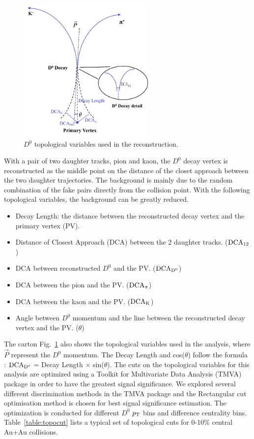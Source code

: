 \documentclass[%
 reprint,	
 amsmath,amssymb,
 aps,
 prc,
]{revtex4-1}
\begin{document}
\begin{figure}
\centering
\includegraphics[width=0.6\textwidth]{fig/D0carton.pdf}
\caption{$D^{0}$ topological variables used in the reconstruction.}
\label{fig:D0carton} 
\end{figure}

With a pair of two daughter tracks, pion and kaon, the $D^0$ decay vertex is reconstructed as the middle point on the distance of the closet approach between the two daughter trajectories. The background is mainly due to the random combination of the fake pairs directly from the collision point. With the following topological variables, the background can be greatly reduced.

 \begin{itemize} 
  \item Decay Length: the distance between the reconstructed decay vertex and the primary vertex (PV).
  \item Distance of Closest Approach (DCA) between the 2 daughter tracks. ($\rm DCA_{12}$)
  \item DCA between reconstructed $D^0$ and the PV. ($\rm DCA_{D^{0}}$)
  \item DCA between the pion and the PV. ($\rm DCA_{\pi}$)
  \item DCA between the kaon and the PV. ($\rm DCA_{K}$)
  \item Angle between $D^0$ momentum and the line between the reconstructed decay vertex and the PV. ($\theta$)
 \end{itemize} 

The carton Fig.~\ref{fig:D0carton} also shows the topological variables used in the analysis, where $\vec{P}$ represent the $D^0$ momentum. The Decay Length and cos($\theta$) follow the formula : $\rm DCA_{D^{0}}$ = Decay Length $\times$ sin($\theta$). The cuts on the topological variables for this analysis are optimized using a Toolkit for Multivariate Data Analysis (TMVA) package in order to have the greatest signal significance. We explored several different discrimination methods in the TMVA package and the Rectangular cut optimisation method is chosen for best signal significance estimation. The optimization is conducted for different $D^0$ $p_{\rm T}$ bins and difference centrality bins. Table~\ref{table:topocut} lists a typical set of topological cuts for 0-10\% central Au+Au collisions.
\end{document}
